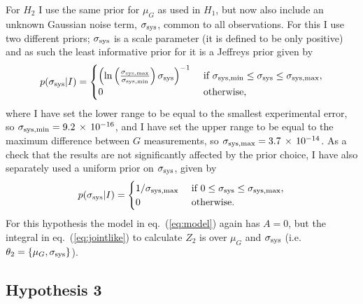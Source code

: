\documentclass[page-classic]{epl2}
\begin{document}
For $H_2$ I use the same prior for $\mu_G$ as used in $H_1$, but now also include an unknown Gaussian
noise term, $\sigma_{\rm sys}$, common to all observations. For this I use two different priors; $\sigma_{\rm sys}$
is a scale parameter (it is defined to be only positive) and as such the least informative prior for it
is a Jeffreys prior given by
\begin{equation}
 p(\sigma_{\rm sys}|I) = \begin{cases}
                          \left(\ln{\left( \frac{\sigma_{\rm sys,max}}{\sigma_{\rm sys,min}} \right)\sigma_{\rm sys} }\right)^{-1}&\text{ if }\sigma_{\rm sys,min} \leq \sigma_{\rm sys} \leq \sigma_{\rm sys,max}, \\
                          0&\text{ otherwise},
                         \end{cases}
\end{equation}
where I have set the lower range to be equal to the smallest experimental error, so
$\sigma_{\rm sys,min} = 9.2\,\times\,10^{-16}$, and I have set the upper range to be equal to the
maximum difference between $G$ measurements, so $\sigma_{\rm sys,max} = 3.7\,\times\,10^{-14}$. As a check
that the results are not significantly affected by the prior choice, I have also separately used a uniform prior
on $\sigma_{\rm sys}$, given by
\begin{equation}
 p(\sigma_{\rm sys}|I) = \begin{cases}
               1/\sigma_{\rm sys,max}&\text{ if }0 \leq \sigma_{\rm sys} \leq \sigma_{\rm sys,max}, \\
               0&\text{ otherwise}.
              \end{cases}
\end{equation}
For this hypothesis the model in eq.~(\ref{eq:model}) again has $A=0$, but the integral in 
eq.~(\ref{eq:jointlike}) to calculate $Z_2$ is over $\mu_G$ and $\sigma_{\rm sys}$ (i.e.\ $\mathbf{\theta}_2 = \{\mu_G, \sigma_{\rm sys}\}$).

\subsection{Hypothesis 3}
\end{document}
